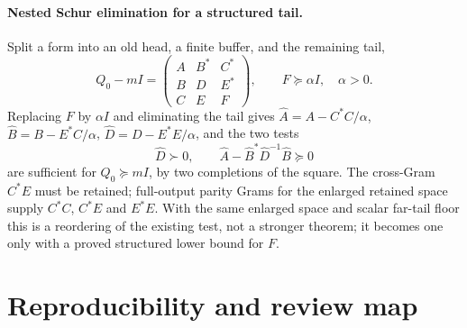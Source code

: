 \documentclass[11pt]{article}
\numberwithin{equation}{section}
\theoremstyle{definition}
\theoremstyle{remark}
\begin{document}
\paragraph{Nested Schur elimination for a structured tail.}
Split a form into an old head, a finite buffer, and the remaining tail,
\[
 Q_0-mI=\begin{pmatrix}
 A&B^*&C^*\\B&D&E^*\\C&E&F
 \end{pmatrix},\qquad F\succeq\alpha I,\quad\alpha>0.
\]
Replacing $F$ by $\alpha I$ and eliminating the tail gives
$\widehat A=A-C^*C/\alpha$, $\widehat B=B-E^*C/\alpha$,
$\widehat D=D-E^*E/\alpha$, and the two tests
\begin{equation}\label{eq:nested-schur}
 \widehat D\succ0,\qquad
 \widehat A-\widehat B^*\widehat D^{-1}\widehat B\succeq0
\end{equation}
are sufficient for $Q_0\succeq mI$, by two completions of the square. The
cross-Gram $C^*E$ must be retained; full-output parity Grams for the enlarged
retained space supply $C^*C$, $C^*E$ and $E^*E$. With the same enlarged space
and scalar far-tail floor this is a reordering of the existing test, not a
stronger theorem; it becomes one only with a proved structured lower bound
for $F$.

\section{Reproducibility and review map}\label{app:reproduce}
\end{document}
